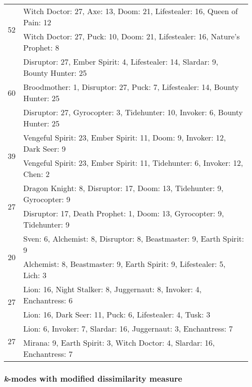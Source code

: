 \documentclass[result.tex]{subfiles}
\begin{document}
\begin{table}[H]
\begin{tabular}{ | c | p{12.5cm} | }
    \multirow{2}{*}{52}
    & Witch Doctor: 27, Axe: 13, Doom: 21, Lifestealer: 16, Queen of Pain: 12 \\
    & Witch Doctor: 27, Puck: 10, Doom: 21, Lifestealer: 16, Nature's Prophet: 8 \\
    \hline
    \multirow{3}{*}{60}
    & Disruptor: 27, Ember Spirit: 4, Lifestealer: 14, Slardar: 9, Bounty Hunter: 25 \\
    & Broodmother: 1, Disruptor: 27, Puck: 7, Lifestealer: 14, Bounty Hunter: 25 \\
    & Disruptor: 27, Gyrocopter: 3, Tidehunter: 10, Invoker: 6, Bounty Hunter: 25 \\
    \hline
    \multirow{2}{*}{39}
    & Vengeful Spirit: 23, Ember Spirit: 11, Doom: 9, Invoker: 12, Dark Seer: 9 \\
    & Vengeful Spirit: 23, Ember Spirit: 11, Tidehunter: 6, Invoker: 12, Chen: 2 \\
    \hline
    \multirow{2}{*}{27}
    & Dragon Knight: 8, Disruptor: 17, Doom: 13, Tidehunter: 9, Gyrocopter: 9 \\
    & Disruptor: 17, Death Prophet: 1, Doom: 13, Gyrocopter: 9, Tidehunter: 9 \\
    \hline
    \multirow{2}{*}{20}
    & Sven: 6, Alchemist: 8, Disruptor: 8, Beastmaster: 9, Earth Spirit: 9 \\
    & Alchemist: 8, Beastmaster: 9, Earth Spirit: 9, Lifestealer: 5, Lich: 3 \\
    \hline
    \multirow{2}{*}{27}
    & Lion: 16, Night Stalker: 8, Juggernaut: 8, Invoker: 4, Enchantress: 6 \\
    & Lion: 16, Dark Seer: 11, Puck: 6, Lifestealer: 4, Tusk: 3 \\
    \hline
    \multirow{2}{*}{27}
    & Lion: 6, Invoker: 7, Slardar: 16, Juggernaut: 3, Enchantress: 7 \\
    & Mirana: 9, Earth Spirit: 3, Witch Doctor: 4, Slardar: 16, Enchantress: 7 \\
    \hline
  \end{tabular}
  \caption{}
  \label{}
\end{table}

\newpage

\subsubsection*{\textit{k}-modes with modified dissimilarity measure}
\end{document}
